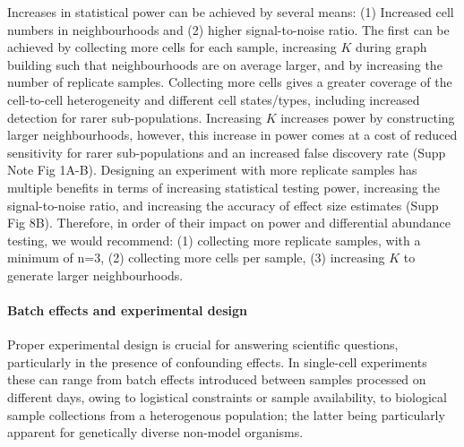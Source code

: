 \documentclass[
]{article}
\begin{document}
Increases in statistical power can be achieved by several means: (1) Increased cell numbers in neighbourhoods and (2) higher signal-to-noise ratio. The first can
be achieved by collecting more cells for each sample, increasing \(K\) during graph building such that neighbourhoods are on average larger, and by increasing the
number of replicate samples. Collecting more cells gives a greater coverage of the cell-to-cell heterogeneity and different cell states/types, including increased
detection for rarer sub-populations. Increasing \(K\) increases power by constructing larger neighbourhoods, however, this increase in power comes at a cost of
reduced sensitivity for rarer sub-populations and an increased false discovery rate (Supp Note Fig 1A-B). Designing an experiment with more replicate samples has
multiple benefits in terms of increasing statistical testing power, increasing the signal-to-noise ratio, and increasing the accuracy of effect size estimates
(Supp Fig 8B). Therefore, in order of their impact on power and differential abundance testing, we would recommend: (1) collecting more replicate samples, with
a minimum of n=3, (2) collecting more cells per sample, (3) increasing \(K\) to generate larger neighbourhoods.

\hypertarget{batch-effects-and-experimental-design}{%
\paragraph*{Batch effects and experimental design}\label{batch-effects-and-experimental-design}}

Proper experimental design is crucial for answering scientific questions, particularly in the presence of confounding effects. In single-cell experiments these
can range from batch effects introduced between samples processed on different days, owing to logistical constraints or sample availability, to biological sample
collections from a heterogenous population; the latter being particularly apparent for genetically diverse non-model organisms.
\end{document}
